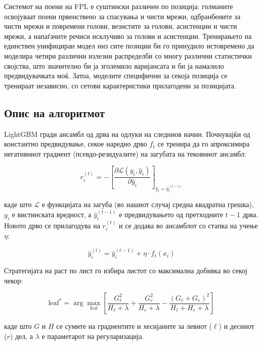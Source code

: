 Системот на поени на FPL е суштински различен по позиција: голманите освојуваат поени првенствено за спасувања и чисти мрежи, одбранбените за чисти мрежи и повремени голови, везистите за голови, асистенции и чисти мрежи, а напаѓачите речиси исклучиво за голови и асистенции. Тренирањето на единствен унифициран модел низ сите позиции би го принудило истовремено да моделира четири различни излезни распределби со многу различни статистички својства, што значително би ја зголемило варијансата и би ја намалило предвидувачката моќ. Затоа, моделите специфични за секоја позиција се тренираат независно, со сетови карактеристики прилагодени за позицијата.

\subsection{Опис на алгоритмот}

LightGBM \cite{ke2017lightgbm} гради ансамбл од дрва на одлуки на следниов начин. Почнувајќи од константно предвидување, секое наредно дрво $f_t$ се тренира да го апроксимира негативниот градиент (псевдо-резидуалите) на загубата на тековниот ансамбл:

\begin{equation}
r_i^{(t)} = -\left[\frac{\partial \mathcal{L}(y_i, \hat{y}_i)}{\partial \hat{y}_i}\right]_{\hat{y}_i = \hat{y}_i^{(t-1)}}
\end{equation}

каде што $\mathcal{L}$ е функцијата на загуба (во нашиот случај средна квадратна грешка), $y_i$ е вистинската вредност, а $\hat{y}_i^{(t-1)}$ е предвидувањето од претходните $t-1$ дрва. Новото дрво се прилагодува на $r_i^{(t)}$ и се додава во ансамблот со стапка на учење $\eta$:

\begin{equation}
\hat{y}_i^{(t)} = \hat{y}_i^{(t-1)} + \eta \cdot f_t(x_i)
\end{equation}

Стратегијата на раст по лист го избира листот со максимална добивка во секој чекор:

\begin{equation}
\text{leaf}^* = \arg\max_{\text{leaf}} \left[ \frac{G_\ell^2}{H_\ell + \lambda} + \frac{G_r^2}{H_r + \lambda} - \frac{(G_\ell + G_r)^2}{H_\ell + H_r + \lambda} \right]
\end{equation}

каде што $G$ и $H$ се сумите на градиентите и хесијаните за левиот ($\ell$) и десниот ($r$) дел, а $\lambda$ е параметарот на регуларизација.

